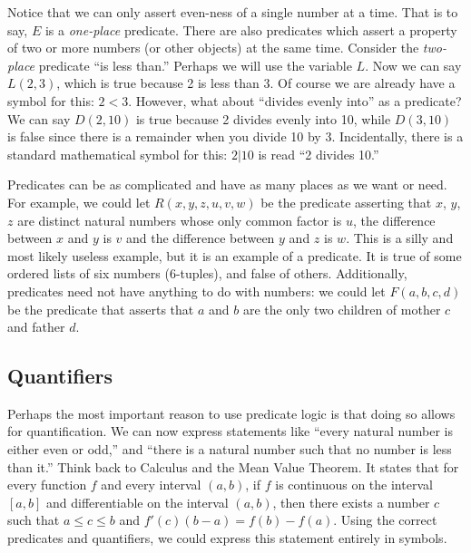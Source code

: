 \documentclass[10pt,]{book}
\theoremstyle{plain}
\theoremstyle{definition}
\theoremstyle{definition}
\theoremstyle{definition}
\numberwithin{equation}{chapter}
\newcommand{\lt}{ < }
\begin{document}
      Notice that we can only assert even-ness of a single number at a time. That is to say, \(E\) is a \emph{one-place} predicate. There are also predicates which assert a property of two or more numbers (or other objects) at the same time. Consider the \emph{two-place} predicate ``is less than.'' Perhaps we will use the variable \(L\). Now we can say \(L(2,3)\), which is true because 2 is less than 3. Of course we are already have a symbol for this: \(2 \lt  3\). However, what about ``divides evenly into'' as a predicate? We can say \(D(2,10)\) is true because 2 divides evenly into 10, while \(D(3, 10)\) is false since there is a remainder when you divide 10 by 3. Incidentally, there is a standard mathematical symbol for this: \(2 | 10\) is read ``2 divides 10.''
\par

      Predicates can be as complicated and have as many places as we want or need. For example, we could let \(R(x,y,z,u,v,w)\) be the predicate asserting that \(x\), \(y\), \(z\) are distinct natural numbers whose only common factor is \(u\), the difference between \(x\) and \(y\) is \(v\) and the difference between \(y\) and \(z\) is \(w\). This is a silly and most likely useless example, but it is an example of a predicate. It is true of some ordered lists of six numbers (6-tuples), and false of others. Additionally, predicates need not have anything to do with numbers: we could let \(F(a,b,c,d)\) be the predicate that asserts that \(a\) and \(b\) are the only two children of mother \(c\) and father \(d\).
\typeout{************************************************}
\typeout{************************************************}
\subsection[Quantifiers]{Quantifiers}\label{subsection-30}

      Perhaps the most important reason to use predicate logic is that doing so allows for quantification. We can now express statements like ``every natural number is either even or odd,'' and ``there is a natural number such that no number is less than it.'' Think back to Calculus and the Mean Value Theorem. It states that for every function \(f\) and every interval \((a, b)\), if \(f\) is continuous on the interval \([a,b]\) and differentiable on the interval \((a,b)\), then there exists a number \(c\) such that \(a \le c \le b\) and \(f'(c)(b - a) = f(b) - f(a)\). Using the correct predicates and quantifiers, we could express this statement entirely in symbols.
\par
\end{document}
